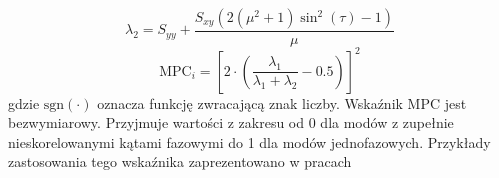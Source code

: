 \begin{equation}
\lambda_{2}=S_{yy}+\frac{S_{xy}(2(\mu^{2}+1)\sin^{2}{(\tau)}-1)}{\mu}
\end{equation}
\begin{equation} \label{eq:mpc_ratio}
\mathrm{MPC}_{i}=\left[2\cdot\left(\frac{\lambda_{1}}{\lambda_{1}+\lambda_{2}}-0.5\right)\right]^{2}
\end{equation}
gdzie $\mathrm{sgn}(\cdot)$ oznacza funkcję zwracającą znak liczby. Wskaźnik MPC jest bezwymiarowy. Przyjmuje wartości z zakresu od 0 dla modów z zupełnie nieskorelowanymi kątami fazowymi do 1 dla modów jednofazowych. Przykłady zastosowania tego wskaźnika zaprezentowano w pracach 
\printbibliography



